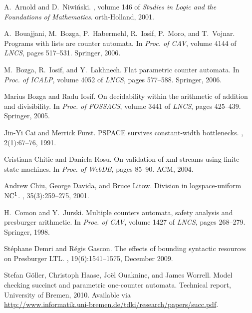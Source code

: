 \documentclass[times,envcountsame]{llncs}
\begin{document}
\def\cprime{$'$}
\begin{thebibliography}{10}

A.~Arnold and D.~Niwi{\'n}ski.
, volume 146 of {\em Studies in
  Logic and the Foundations of Mathematics}.
orth-{H}olland, 2001.

A.~Bouajjani, M.~Bozga, P.~Habermehl, R.~Iosif, P.~Moro, and T.~Vojnar.
\newblock Programs with lists are counter automata.
\newblock In {\em Proc. of CAV}, volume 4144 of {\em LNCS}, pages 517--531. Springer, 2006.

M.~Bozga, R.~Iosif, and Y.~Lakhnech.
\newblock Flat parametric counter automata.
\newblock In {\em Proc. of ICALP}, volume 4052 of {\em LNCS}, pages 577--588. Springer, 2006.

Marius Bozga and Radu Iosif.
\newblock On decidability within the arithmetic of addition and divisibility.
\newblock In {\em Proc. of FOSSACS}, volume 3441 of {\em LNCS}, pages 425--439. Springer,
  2005.

Jin-Yi Cai and Merrick Furst.
\newblock P{SPACE} survives constant-width bottlenecks.
, 2(1):67--76, 1991.

Cristiana Chitic and Daniela Rosu.
\newblock On validation of xml streams using finite state machines.
\newblock In {\em Proc. of WebDB}, pages 85--90. ACM, 2004.

Andrew Chiu, George Davida, and Bruce Litow.
\newblock Division in logspace-uniform {$\rm NC\sp 1$}.
, 35(3):259--275, 2001.

H.~Comon and Y.~Jurski.
\newblock Multiple counters automata, safety analysis and presburger
  arithmetic.
\newblock In {\em Proc. of {CAV}}, volume 1427 of {\em LNCS}, pages 268--279. Springer, 1998.

St{\'e}phane Demri and R{\'e}gis Gascon.
\newblock The effects of bounding syntactic resources on {P}resburger {LTL}.
, 19(6):1541--1575, December 2009.

Stefan G{\"o}ller, Christoph Haase, Jo{\"e}l Ouaknine, and James Worrell.
\newblock Model checking succinct and parametric one-counter automata.
\newblock Technical report, University of Bremen, 2010.
\newblock Available via\\
  \url{http://www.informatik.uni-bremen.de/tdki/research/papers/succ.pdf}.


\end{thebibliography}
\end{document}
